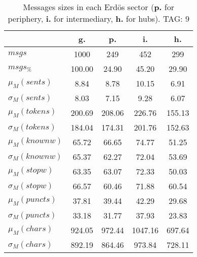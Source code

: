 \begin{table}[h!]
\begin{center}
\begin{tabular}{| l || c | c | c | c |}\hline
 & {\bf g.} & {\bf p.} & {\bf i.} & {\bf h.} \\\hline\hline
$msgs$ & 1000  & 249  & 452  & 299 \\
$msgs_{\%}$ & 100.00  & 24.90  & 45.20  & 29.90 \\\hline
$\mu_M(sents)$ & 8.84  & 8.78  & 10.15  & 6.91 \\
$\sigma_M(sents)$ & 8.03  & 7.15  & 9.28  & 6.07 \\\hline
$\mu_M(tokens)$ & 200.69  & 208.06  & 226.76  & 155.13 \\
$\sigma_M(tokens)$ & 184.04  & 174.31  & 201.76  & 152.63 \\\hline
$\mu_M(knownw)$ & 65.72  & 66.65  & 74.77  & 51.25 \\
$\sigma_M(knownw)$ & 65.37  & 62.27  & 72.04  & 53.69 \\\hline
$\mu_M(stopw)$ & 63.35  & 63.07  & 72.33  & 50.03 \\
$\sigma_M(stopw)$ & 66.57  & 60.46  & 71.88  & 60.54 \\\hline
$\mu_M(puncts)$ & 37.81  & 39.44  & 42.29  & 29.68 \\
$\sigma_M(puncts)$ & 33.18  & 31.77  & 37.93  & 23.83 \\\hline
$\mu_M(chars)$ & 924.05  & 972.44  & 1047.16  & 697.64 \\
$\sigma_M(chars)$ & 892.19  & 864.46  & 973.84  & 728.11 \\\hline
\end{tabular}
\caption{Messages sizes in each Erd\"os sector ({{\bf p.}} for periphery, {{\bf i.}} for intermediary, {{\bf h.}} for hubs). TAG: 9}
\end{center}
\end{table}